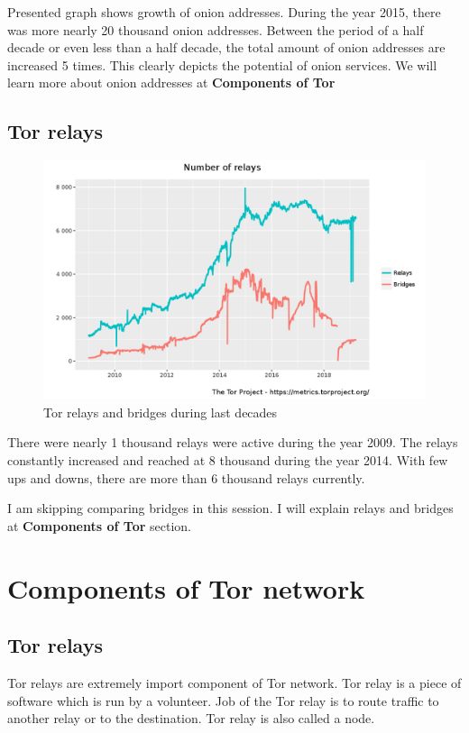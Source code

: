 \documentclass{article}
\begin{document}
    Presented graph shows growth of onion addresses. During the year 2015,
    there was more nearly 20 thousand onion addresses. Between the period of a
    half decade or even less than a half decade, the total amount of onion
    addresses are increased 5 times. This clearly depicts the potential of
    onion services. We will learn more about onion addresses at
    \textbf{Components of Tor}

  \subsection{Tor relays}
    \begin{figure}[h!]
      \includegraphics[width=\linewidth]{relays-and-bridges-in-last-decade.png}
      \caption{Tor relays and bridges during last decades}
      \label{fig:relays_and_bridges_during_last_decade}
    \end{figure}

    There were nearly 1 thousand relays were active during the year 2009. The
    relays constantly increased and reached at 8 thousand during the year 2014.
    With few ups and downs, there are more than 6 thousand relays currently.

    I am skipping comparing bridges in this session. I will explain relays and
    bridges at \textbf{Components of Tor} section.

  \section{Components of Tor network}

    \subsection{Tor relays}
      Tor relays are extremely import component of Tor network. Tor relay is a
      piece of software which is run by a volunteer. Job of the Tor relay is to
      route traffic to another relay or to the destination. Tor relay is also
      called a node.
\end{document}
